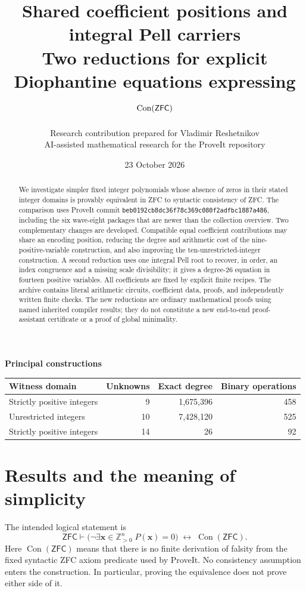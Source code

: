 \documentclass[11pt,a4paper]{article}
\title{Shared coefficient positions and integral Pell carriers\\[4pt]
\large Two reductions for explicit Diophantine equations expressing $\Con(\ZFC)$}
\author{Research contribution prepared for Vladimir Reshetnikov\\
\small AI-assisted mathematical research for the ProveIt repository}
\date{23 October 2026}
\newcommand{\Zp}{\mathbb Z_{>0}}
\newcommand{\Con}{\operatorname{Con}}
\newcommand{\ZFC}{\mathsf{ZFC}}
\theoremstyle{definition}\newtheorem{definition}[theorem]{Definition}
\theoremstyle{remark}\newtheorem{remark}[theorem]{Remark}
\begin{document}
\maketitle
\begin{abstract}
We investigate simpler fixed integer polynomials whose absence of zeros
in their stated integer domains is provably equivalent in ZFC to syntactic
consistency of ZFC.
The comparison uses ProveIt commit
\texttt{beb0192cb8dc36f78c369c080f2adfbc1887a486}, including the six
wave-eight packages that are newer than the collection overview.
Two complementary changes are developed. Compatible equal coefficient
contributions may share an encoding position, reducing the degree and
arithmetic cost of the nine-positive-variable construction, and also improving
the ten-unrestricted-integer construction. A second reduction
uses one integral Pell root to recover, in order, an index congruence and
a missing scale divisibility; it gives a degree-26 equation in fourteen
positive variables. All coefficients are fixed by explicit finite recipes.
The archive contains literal arithmetic circuits, coefficient data,
proofs, and independently written finite checks. The new reductions are
ordinary mathematical proofs using named inherited compiler results;
they do not constitute a new end-to-end proof-assistant certificate or a
proof of global minimality.
\end{abstract}
\begin{center}
\small
\textbf{Principal constructions}\\[6pt]
\begin{tabular}{@{}lrrr@{}}\toprule
Witness domain & Unknowns & Exact degree & Binary operations\\\midrule
Strictly positive integers & 9 & 1,675,396 & 458\\
Unrestricted integers & 10 & 7,428,120 & 525\\
Strictly positive integers & 14 & 26 & 92\\\bottomrule
\end{tabular}
\end{center}
\clearpage
\tableofcontents
\clearpage
\section{Results and the meaning of simplicity}
\label{sec:results}
The intended logical statement is
\begin{equation}\label{eq:target}
 \ZFC\vdash
 \bigl(\neg\exists\mathbf x\in\Zp^n\;P(\mathbf x)=0\bigr)
 \;\longleftrightarrow\;\Con(\ZFC).
\end{equation}
Here $\Con(\ZFC)$ means that there is no finite derivation of falsity from
the fixed syntactic ZFC axiom predicate used by ProveIt. No consistency
assumption enters the construction. In particular, proving the equivalence
does not prove either side of it.
\end{document}
